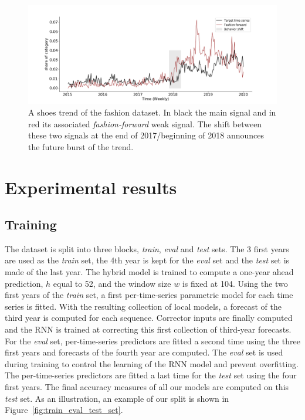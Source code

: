 \documentclass[review]{elsarticle}
\newcommand{\lag}{h}
\newcommand{\window}{w}
\begin{document}
\begin{figure}
  \centering
    \includegraphics[width=1.\linewidth]{figure/ff_example}
  \caption{A shoes trend of the fashion dataset. In black the main signal and in red its associated \textit{fashion-forward} weak signal. The shift between these two signals at the end of 2017/beginning of 2018 announces the future burst of the trend.}
\label{fig:oneemergingtrend}
\end{figure}





\section{Experimental results}
\label{sec:exp}

\subsection{Training}
The dataset is split into three blocks, {\em train}, {\em eval} and {\em test} sets. The 3 first years are used as the {\em train} set, the 4th year is kept for the {\em eval} set and the {\em test} set is made of the last year. The hybrid model is trained to compute a one-year ahead prediction, $\lag$ equal to 52, and the window size $\window$ is fixed at 104.
Using the two first years of the {\em train} set, a first per-time-series parametric model for each time series is fitted. With the resulting collection of local models, a forecast of the third year is computed for each sequence. Corrector inputs are finally computed and the RNN is trained at correcting this first collection of third-year forecasts. For the {\em eval} set, per-time-series predictors are fitted a second time using the three first years and forecasts of the fourth year are computed. The {\em eval} set is used during  training to control the learning of the RNN model and prevent overfitting. The per-time-series predictors are fitted a last time for the {\em test} set using the four first years. The final accuracy measures of all our models are computed on this {\em test} set. As an illustration, an example of our split is shown in Figure~\ref{fig:train_eval_test_set}.
\end{document}
